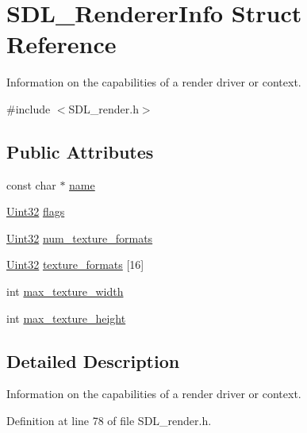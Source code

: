 \hypertarget{struct_s_d_l___renderer_info}{}\section{S\+D\+L\+\_\+\+Renderer\+Info Struct Reference}
\label{struct_s_d_l___renderer_info}


Information on the capabilities of a render driver or context.  




{\ttfamily \#include $<$S\+D\+L\+\_\+render.\+h$>$}

\subsection*{Public Attributes}
\begin{DoxyCompactItemize}
\item 
const char $\ast$ \mbox{\hyperlink{struct_s_d_l___renderer_info_a433ecb2865c81ba9f28038e56a4ae6f3}{name}}
\item 
\mbox{\hyperlink{_s_d_l__stdinc_8h_add440eff171ea5f55cb00c4a9ab8672d}{Uint32}} \mbox{\hyperlink{struct_s_d_l___renderer_info_a95cf0ffd1704fd0a4dd8ceac6c9f0542}{flags}}
\item 
\mbox{\hyperlink{_s_d_l__stdinc_8h_add440eff171ea5f55cb00c4a9ab8672d}{Uint32}} \mbox{\hyperlink{struct_s_d_l___renderer_info_acdec165b2053b914313f5996983ec6b8}{num\+\_\+texture\+\_\+formats}}
\item 
\mbox{\hyperlink{_s_d_l__stdinc_8h_add440eff171ea5f55cb00c4a9ab8672d}{Uint32}} \mbox{\hyperlink{struct_s_d_l___renderer_info_a88450f9d48e593ec4571e3ba7cc3427d}{texture\+\_\+formats}} \mbox{[}16\mbox{]}
\item 
int \mbox{\hyperlink{struct_s_d_l___renderer_info_a6e6757e3d5c1f0922adaba39380edfa6}{max\+\_\+texture\+\_\+width}}
\item 
int \mbox{\hyperlink{struct_s_d_l___renderer_info_a87c6a13e8d535c2148f8913c05e13102}{max\+\_\+texture\+\_\+height}}
\end{DoxyCompactItemize}


\subsection{Detailed Description}
Information on the capabilities of a render driver or context. 

Definition at line 78 of file S\+D\+L\+\_\+render.\+h.



